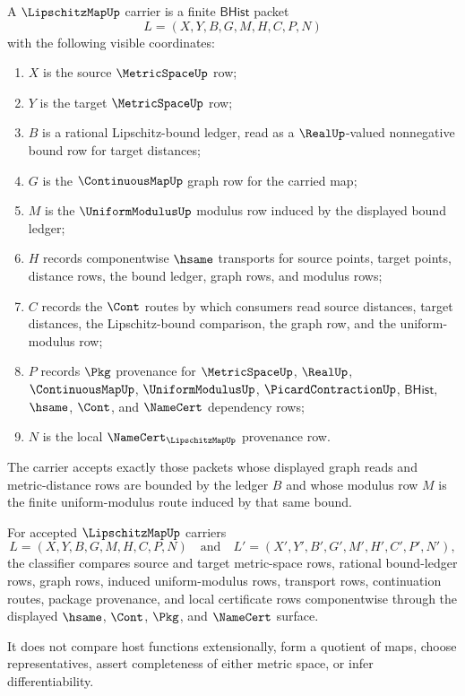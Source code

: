 \begin{definition}
\label{def:lipschitz-map-carrier}
A $\LipschitzMapUp$ carrier is a finite $\mathsf{BHist}$ packet
$$
L=(X,Y,B,G,M,H,C,P,N)
$$
with the following visible coordinates:
\begin{enumerate}
\item $X$ is the source $\MetricSpaceUp$ row;
\item $Y$ is the target $\MetricSpaceUp$ row;
\item $B$ is a rational Lipschitz-bound ledger, read as a $\RealUp$-valued
nonnegative bound row for target distances;
\item $G$ is the $\ContinuousMapUp$ graph row for the carried map;
\item $M$ is the $\UniformModulusUp$ modulus row induced by the displayed bound
ledger;
\item $H$ records componentwise $\hsame$ transports for source points, target
points, distance rows, the bound ledger, graph rows, and modulus rows;
\item $C$ records the $\Cont$ routes by which consumers read source distances,
target distances, the Lipschitz-bound comparison, the graph row, and the
uniform-modulus row;
\item $P$ records $\Pkg$ provenance for $\MetricSpaceUp$, $\RealUp$,
$\ContinuousMapUp$, $\UniformModulusUp$, $\PicardContractionUp$, $\mathsf{BHist}$,
$\hsame$, $\Cont$, and $\NameCert$ dependency rows;
\item $N$ is the local $\NameCert_{\LipschitzMapUp}$ provenance row.
\end{enumerate}
The carrier accepts exactly those packets whose displayed graph reads and
metric-distance rows are bounded by the ledger $B$ and whose modulus row $M$ is
the finite uniform-modulus route induced by that same bound.
\end{definition}

\begin{definition}
\label{def:lipschitz-map-classifier}
For accepted $\LipschitzMapUp$ carriers
$$
L=(X,Y,B,G,M,H,C,P,N)
\quad\text{and}\quad
L'=(X',Y',B',G',M',H',C',P',N'),
$$
the classifier compares source and target metric-space rows, rational
bound-ledger rows, graph rows, induced uniform-modulus rows, transport rows,
continuation routes, package provenance, and local certificate rows
componentwise through the displayed $\hsame$, $\Cont$, $\Pkg$, and $\NameCert$
surface.

It does not compare host functions extensionally, form a quotient of maps,
choose representatives, assert completeness of either metric space, or infer
differentiability.
\end{definition}

